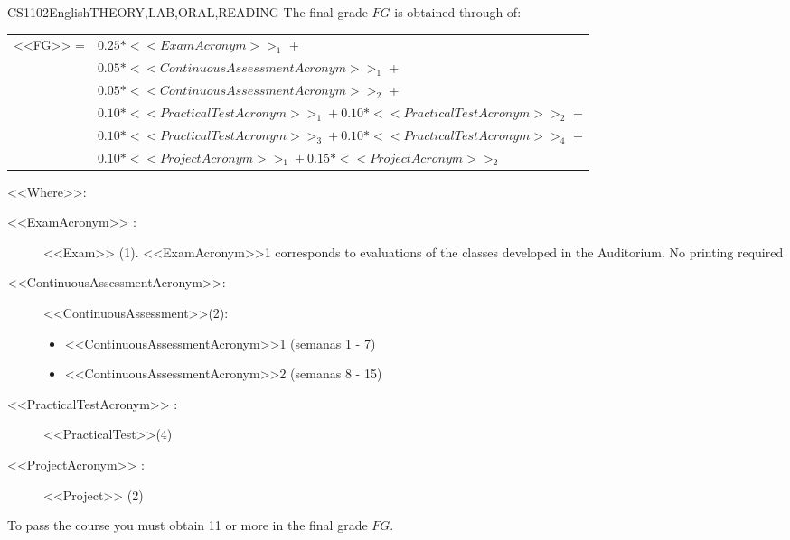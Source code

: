     \begin{evaluation}{CS1102}{English}{THEORY,LAB,ORAL,READING}
    The final grade $FG$ is obtained through of:
   
    \begin{tabular}{cl}
        <<FG>> = & $0.25*<<ExamAcronym>>_{1}$ + \\
                 & $0.05*<<ContinuousAssessmentAcronym>>_{1}$ +  \\
                 & $0.05*<<ContinuousAssessmentAcronym>>_{2}$ + \\
                 & $0.10*<<PracticalTestAcronym>>_{1} + 0.10*<<PracticalTestAcronym>>_{2}$ + \\
                 & $0.10*<<PracticalTestAcronym>>_{3} + 0.10*<<PracticalTestAcronym>>_{4}$ + \\
                 & $0.10*<<ProjectAcronym>>_{1} + 0.15*<<ProjectAcronym>>_{2}$
    \end{tabular}
 
    \noindent <<Where>>:
    \begin{description}
        \item[<<ExamAcronym>> :] <<Exam>> (1). <<ExamAcronym>>1 corresponds to evaluations of the classes developed in the Auditorium. No printing required
        \item[<<ContinuousAssessmentAcronym>>:]<<ContinuousAssessment>>(2):
           \begin{itemize}
               \item <<ContinuousAssessmentAcronym>>1 (semanas 1 - 7) 
               \item <<ContinuousAssessmentAcronym>>2 (semanas 8 - 15)
         \end{itemize}
    \item[<<PracticalTestAcronym>> :] <<PracticalTest>>(4)
    \item[<<ProjectAcronym>> :] <<Project>> (2)
    \end{description}
   
    \noindent To pass the course you must obtain 11 or more in the final grade $FG$.
    \end{evaluation}
   
   
   
